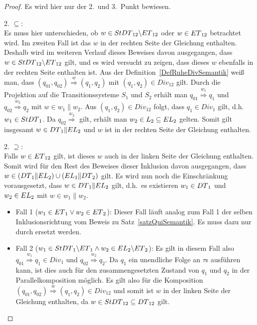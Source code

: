 \begin{proof} Es wird hier nur der 2.\ und 3.\ Punkt bewiesen.

  2. \glqq{}$\subseteq$\grqq{}:\\
  Es muss hier unterschieden, ob $w\in StDT{}_{12}\backslash ET{}_{12}$ oder
  $w\in ET{}_{12}$ betrachtet wird. Im zweiten Fall ist das $w$ in der rechten
  Seite der Gleichung enthalten. Deshalb wird im weiteren Verlauf dieses
  Beweises davon ausgegangen, dass $w\in StDT{}_{12}\backslash ET{}_{12}$
  gilt, und es wird versucht zu zeigen, dass dieses $w$ ebenfalls in der
  rechten Seite enthalten ist. Aus der Definition~\ref{DefRuheDivSemantik} weiß
  man, dass $(q_{01},q_{02}) \overset{w}{\Rightarrow} (q_1,q_2)$ mit
  $(q_1,q_2)\in Div_{12}$ gilt. Durch die Projektion auf die Transitionssysteme
  $S_1$ und $S_2$ erhält man $q_{01} \overset{w_1}{\Rightarrow} q_1$ und
  $q_{02} \overset{w_2}{\Rightarrow} q_2$ mit $w\in w_1\|w_2$. Aus
  $(q_1,q_2)\in Div_{12}$ folgt, dass \oBdA{} $q_1\in Div_1$ gilt, d.h.\
  $w_1\in StDT{}_1$. Da $q_{02} \overset{w_2}{\Rightarrow}$ gilt, erhält man
  $w_2\in L_2\subseteq EL{}_2$ gelten. Somit gilt insgesamt $w\in
  DT{}_1\|EL{}_2$ und $w$ ist in der rechten Seite der Gleichung enthalten.

  2. \glqq{}$\supseteq$\grqq{}:\\
  Falls $w\in ET{}_{12}$ gilt, ist dieses $w$ auch in der linken Seite der
  Gleichung enthalten. Somit wird für den Rest des Beweises dieser Inklusion
  davon ausgegangen, dass $w\in(DT{}_1\|EL{}_2)\cup (EL{}_1\|DT{}_2)$ gilt.
  Es wird nun noch die Einschränkung vorausgesetzt, dass \oBdA{} $w\in
  DT{}_1\|EL{}_2$ gilt, d.h.\ es existieren $w_1\in DT{}_1$ und
  $w_2\in EL{}_2$ mit $w\in w_1\|w_2$.
  \begin{itemize}
    \item Fall 1 ($w_1\in ET{}_1 \vee w_2\in ET{}_2$): Dieser Fall läuft
      analog zum Fall 1 der selben Inklusionsrichtung vom Beweis zu
      Satz~\ref{satzQuiSemantik}. Es muss dazu nur \StQT{} durch \StDT{}
      ersetzt werden.
    \item Fall 2 ($w_1\in StDT{}_1\backslash ET{}_1 \wedge w_2\in
      EL{}_2\backslash ET{}_2$): Es gilt in diesem Fall also $q_{01}
      \overset{w_1}{\Rightarrow} q_1\in Div_1$ und $q_{02}
      \overset{w_2}{\Rightarrow} q_2$. Da $q_1$ ein unendliche Folge an $\tau$s
      ausführen kann, ist dies auch für den zusammengesetzten Zustand von $q_1$
      und $q_2$ in der Parallelkomposition möglich. Es gilt also für die
      Komposition $(q_{01},q_{02}) \overset{w}{\Rightarrow} (q_1,q_2)\in
      Div_{12}$ und somit ist $w$ in der linken Seite der Gleichung enthalten,
      da $w\in StDT{}_{12}\subseteq DT{}_{12}$ gilt.
  \end{itemize}


\end{proof}

